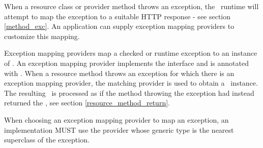When a resource class or provider method throws an exception, the \jaxrs\ runtime will attempt to map the exception to a suitable HTTP response - see section \ref{method_exc}. An application can supply exception mapping providers to customize this mapping.

Exception mapping providers map a checked or runtime exception to an instance of \Response. An exception mapping provider implements the  interface and is annotated with \Provider. When a resource method throws an exception for which there is an exception mapping provider, the matching provider is used to obtain a \Response\ instance. The resulting \Response\ is processed as if the method throwing the exception had instead returned the \Response, see section \ref{resource_method_return}.

When choosing an exception mapping provider to map an exception, an implementation MUST use the provider whose generic type is the nearest superclass of the exception.
